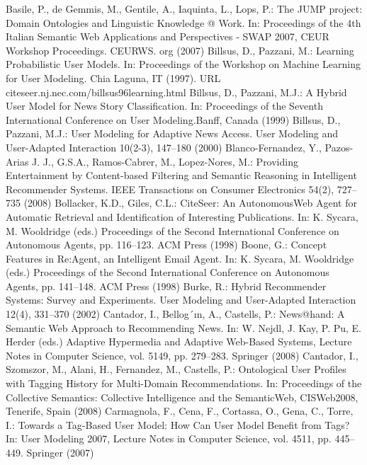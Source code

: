 \begin{thebibliography}{110}
Basile, P., de Gemmis, M., Gentile, A., Iaquinta, L., Lops, P.: The JUMP project: Domain Ontologies and Linguistic Knowledge @ Work. In: Proceedings of the 4th Italian Semantic Web Applications and Perspectives - SWAP 2007, CEUR Workshop Proceedings. CEURWS. org (2007)
Billsus, D., Pazzani, M.: Learning Probabilistic User Models. In: Proceedings of the Workshop on Machine Learning for User Modeling. Chia Laguna, IT (1997). URL citeseer.nj.nec.com/billsus96learning.html
Billsus, D., Pazzani, M.J.: A Hybrid User Model for News Story Classification. In: Proceedings of the Seventh International Conference on User Modeling.Banff, Canada (1999)
Billsus, D., Pazzani, M.J.: User Modeling for Adaptive News Access. User Modeling and User-Adapted Interaction 10(2-3), 147–180 (2000)
Blanco-Fernandez, Y., Pazos-Arias J. J., G.S.A., Ramos-Cabrer, M., Lopez-Nores, M.: Providing Entertainment by Content-based Filtering and Semantic Reasoning in Intelligent Recommender Systems. IEEE Transactions on Consumer Electronics 54(2), 727–735 (2008)
Bollacker, K.D., Giles, C.L.: CiteSeer: An AutonomousWeb Agent for Automatic Retrieval and Identification of Interesting Publications. In: K. Sycara, M. Wooldridge (eds.) Proceedings of the Second International Conference on Autonomous Agents, pp. 116–123. ACM Press (1998)
Boone, G.: Concept Features in Re:Agent, an Intelligent Email Agent. In: K. Sycara, M. Wooldridge (eds.) Proceedings of the Second International Conference on Autonomous Agents, pp. 141–148. ACM Press (1998)
Burke, R.: Hybrid Recommender Systems: Survey and Experiments. User Modeling and User-Adapted Interaction 12(4), 331–370 (2002)
Cantador, I., Bellog´ın, A., Castells, P.: News@hand: A Semantic Web Approach to Recommending News. In: W. Nejdl, J. Kay, P. Pu, E. Herder (eds.) Adaptive Hypermedia and Adaptive Web-Based Systems, Lecture Notes in Computer Science, vol. 5149, pp. 279–283. Springer (2008)
Cantador, I., Szomszor, M., Alani, H., Fernandez, M., Castells, P.: Ontological User Profiles with Tagging History for Multi-Domain Recommendations. In: Proceedings of the Collective Semantics: Collective Intelligence and the SemanticWeb, CISWeb2008, Tenerife, Spain (2008)
Carmagnola, F., Cena, F., Cortassa, O., Gena, C., Torre, I.: Towards a Tag-Based User Model: How Can User Model Benefit from Tags? In: User Modeling 2007, Lecture Notes in Computer Science, vol. 4511, pp. 445–449. Springer (2007)

\end{thebibliography}
